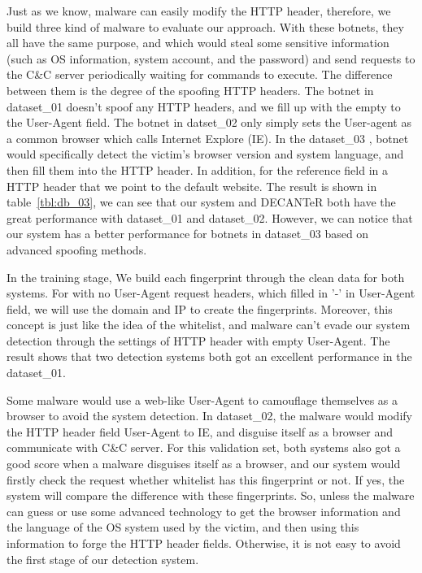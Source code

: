 Just as we know, malware can easily modify the HTTP header, therefore, we build three kind of malware to evaluate our approach. With these botnets, they all have the same purpose, and which would steal some sensitive information (such as OS information, system account, and the password) and send requests to the C\&C server periodically waiting for commands to execute. The difference between them is the degree of the spoofing HTTP headers. The botnet in dataset\_01 doesn't spoof any HTTP headers, and we fill up with the empty to the User-Agent field. The botnet in datset\_02 only simply sets the User-agent as a common browser which calls Internet Explore (IE). In the dataset\_03 , botnet would specifically detect the victim's browser version and system language, and then fill them into the HTTP header. In addition, for the reference field in a HTTP header that we point to the default website. The result is shown in table~\ref{tbl:db_03}, we can see that our system and DECANTeR \cite{bortolameotti2017decanter} both have the great performance with dataset\_01 and dataset\_02. However, we can notice that our system has a better performance for botnets in dataset\_03 based on advanced spoofing methods.

In the training stage, We build each fingerprint through the clean data for both systems. For with no User-Agent request headers, which filled in '-' in User-Agent field, we will use the domain and IP to create the fingerprints. Moreover, this concept is just like the idea of the whitelist, and malware can't evade our system detection through the settings of HTTP header with empty User-Agent. The result shows that two detection systems both got an excellent performance in the dataset\_01.

Some malware would use a web-like User-Agent to camouflage themselves as a browser to avoid the system detection. In dataset\_02, the malware would modify the HTTP header field User-Agent to IE, and disguise itself as a browser and communicate with C\&C server. For this validation set, both systems also got a good score when a malware disguises itself as a browser, and our system would firstly check the request whether whitelist has this fingerprint or not. If yes, the system will compare the difference with these fingerprints. So, unless the malware can guess or use some advanced technology to get the browser information and the language of the OS system used by the victim, and then using this information to forge the HTTP header fields. Otherwise, it is not easy to avoid the first stage of our detection system.

